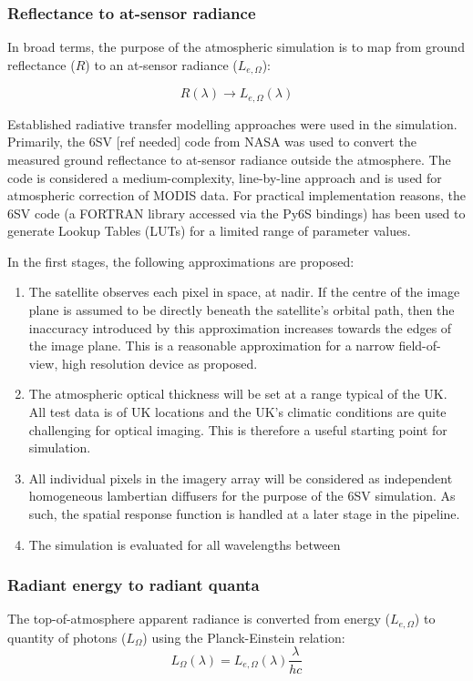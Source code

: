 \documentclass[10pt,a4paper,final,onecolumn]{article}
\begin{document}
\subsubsection{Reflectance to at-sensor radiance}
In broad terms, the purpose of the atmospheric simulation is to map from ground reflectance ($R$) to an at-sensor radiance ($L_{e, \Omega}$):

\begin{equation}
R(\lambda) \rightarrow L_{e, \Omega} (\lambda)
\end{equation}

Established radiative transfer modelling approaches were used in the simulation. Primarily, the 6SV [ref needed] code from NASA was used to convert the measured ground reflectance to at-sensor radiance outside the atmosphere. The code is considered a medium-complexity, line-by-line approach and is used for atmospheric correction of MODIS data. For practical implementation reasons, the 6SV code (a FORTRAN library accessed via the Py6S bindings) has been used to generate Lookup Tables (LUTs) for a limited range of parameter values.

In the first stages, the following approximations are proposed:
\begin{enumerate}
\item The satellite observes each pixel in space, at nadir. If the centre of the image plane is assumed to be directly beneath the satellite's orbital path, then the inaccuracy introduced by this approximation increases towards the edges of the image plane. This is a reasonable approximation for a narrow field-of-view, high resolution device as proposed. 
\item The atmospheric optical thickness will be set at a range typical of the UK. All test data is of UK locations and the UK's climatic conditions are quite challenging for optical imaging. This is therefore a useful starting point for simulation.
\item All individual pixels in the imagery array will be considered as independent homogeneous lambertian diffusers for the purpose of the 6SV simulation. As such, the spatial response function is handled at a later stage in the pipeline.
\item The simulation is evaluated for all wavelengths between 
\end{enumerate}

\subsubsection{Radiant energy to radiant quanta}
The top-of-atmosphere apparent radiance is converted from energy ($L_{e,\Omega}$) to quantity of photons ($L_{\Omega}$) using the Planck-Einstein relation:
\begin{equation}
L_{\Omega}(\lambda) = L_{e,\Omega}(\lambda)\frac{\lambda}{hc}
\end{equation}
\end{document}
